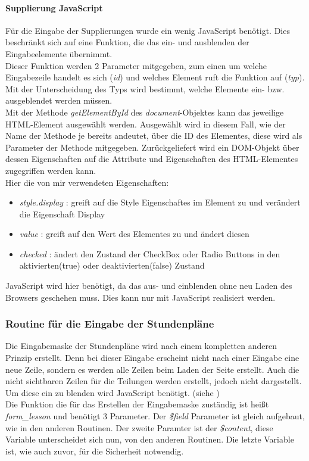 \paragraph{Supplierung JavaScript}\label{sec:content_imple_input_java}
Für die Eingabe der Supplierungen wurde ein wenig JavaScript benötigt. Dies beschränkt sich auf eine Funktion, die das ein- und ausblenden der Eingabeelemente übernimmt.\\
Dieser Funktion werden 2 Parameter mitgegeben, zum einen um welche Eingabezeile handelt es sich (\textit{id}) und welches Element ruft die Funktion auf (\textit{typ}).\\
Mit der Unterscheidung des Typs wird bestimmt, welche Elemente ein- bzw. ausgeblendet werden müssen.\\
Mit der Methode \textit{getElementById} des \textit{document}-Objektes kann das jeweilige HTML-Element ausgewählt werden. Ausgewählt wird in diesem Fall, wie der Name der Methode je bereits andeutet, über die ID des Elementes, diese wird als Parameter der Methode mitgegeben. Zurückgeliefert wird ein DOM-Objekt über dessen Eigenschaften auf die Attribute und Eigenschaften des HTML-Elementes zugegriffen werden kann.\\
Hier die von mir verwendeten Eigenschaften:
\begin{itemize}
	\item \textit{style.display} : greift auf die Style Eigenschaftes im Element zu und verändert die Eigenschaft Display
	\item \textit{value} : greift auf den Wert des Elementes zu und ändert diesen
	\item \textit{checked} : ändert den Zustand der CheckBox oder Radio Buttons in den aktivierten(true) oder deaktivierten(false) Zustand
\end{itemize}
JavaScript wird hier benötigt, da das aus- und einblenden ohne neu Laden des Browsers geschehen muss. Dies kann nur mit JavaScript realisiert werden.\\

\subsubsection{Routine für die Eingabe der Stundenpläne}
Die Eingabemaske der Stundenpläne wird nach einem kompletten anderen Prinzip erstellt. Denn bei dieser Eingabe erscheint nicht nach einer Eingabe eine neue Zeile, sondern es werden alle Zeilen beim Laden der Seite erstellt. Auch die nicht sichtbaren Zeilen für die Teilungen werden erstellt, jedoch nicht dargestellt. Um diese ein zu blenden wird JavaScript benötigt. (siehe \nameref{})\\
Die Funktion die für das Erstellen der Eingabemaske zuständig ist heißt \textit{form\_lesson} und benötigt 3 Parameter. Der \textit{\$field} Parameter ist gleich aufgebaut, wie in den anderen Routinen. Der zweite Paramter ist der \textit{\$content}, diese Variable unterscheidet sich nun, von den anderen Routinen. Die letzte Variable ist, wie auch zuvor, für die Sicherheit notwendig.\\
